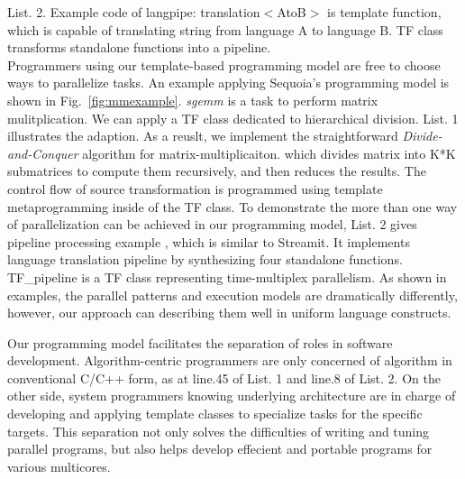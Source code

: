 List. 2.  Example code of langpipe: translation$<$AtoB$>$ is template function,
which is capable of translating string from language A to language
B. TF class transforms standalone functions into a pipeline. \\

Programmers using our template-based programming model are free to
choose ways to parallelize tasks. An example applying 
Sequoia's programming model is shown in Fig.~\ref{fig:mmexample}. 
\textit{sgemm} is a task to perform matrix mulitplication. 
We can apply a TF class dedicated to hierarchical division.  List. 1
illustrates the adaption. As a reuslt, we
implement the straightforward \emph{Divide-and-Conquer} algorithm for matrix-multiplicaiton. which divides matrix into K*K
submatrices to compute them recursively, and then reduces the results.
The control flow of source transformation is programmed
using template metaprogramming inside of the TF class. 
To demonstrate the more than one way of parallelization can be
achieved in our programming model, List. 2 gives pipeline processing example
, which is similar to Streamit. It implements language translation pipeline by
synthesizing four standalone functions. TF\_pipeline is a TF class
representing time-multiplex parallelism. As shown in examples,
the parallel patterns and execution models are dramatically
differently, however, our approach can describing them well in uniform
language constructs.

Our programming model facilitates the separation of roles in software
development. Algorithm-centric programmers are only concerned of algorithm
in conventional C/C++ form, as at line.45 of List. 1 and line.8 of
List. 2. On the other side,  system programmers knowing underlying
architecture are in charge of developing and
applying template classes to specialize tasks for the specific
targets. This separation not only solves the difficulties of writing and
tuning parallel programs, but also helps develop effecient and
portable programs for various multicores.


